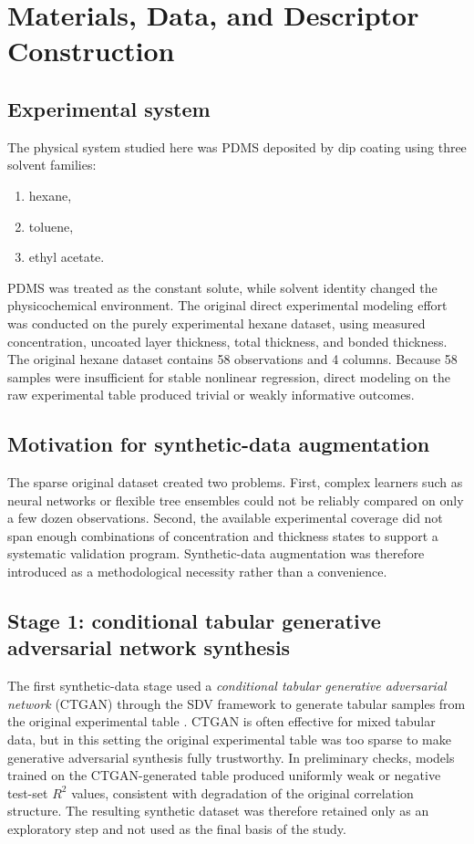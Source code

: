 \documentclass[11pt]{article}
\begin{document}
\section{Materials, Data, and Descriptor Construction}

\subsection{Experimental system}
The physical system studied here was PDMS deposited by dip coating using three solvent families:
\begin{enumerate}
    \item hexane,
    \item toluene,
    \item ethyl acetate.
\end{enumerate}

PDMS was treated as the constant solute, while solvent identity changed the physicochemical environment. The original direct experimental modeling effort was conducted on the purely experimental hexane dataset, using measured concentration, uncoated layer thickness, total thickness, and bonded thickness. The original hexane dataset contains 58 observations and 4 columns. Because 58 samples were insufficient for stable nonlinear regression, direct modeling on the raw experimental table produced trivial or weakly informative outcomes.

\subsection{Motivation for synthetic-data augmentation}
The sparse original dataset created two problems. First, complex learners such as neural networks or flexible tree ensembles could not be reliably compared on only a few dozen observations. Second, the available experimental coverage did not span enough combinations of concentration and thickness states to support a systematic validation program. Synthetic-data augmentation was therefore introduced as a methodological necessity rather than a convenience.

\subsection{Stage 1: conditional tabular generative adversarial network synthesis}
The first synthetic-data stage used a \textit{conditional tabular generative adversarial network} (CTGAN) through the SDV framework to generate tabular samples from the original experimental table \cite{xu2019}. CTGAN is often effective for mixed tabular data, but in this setting the original experimental table was too sparse to make generative adversarial synthesis fully trustworthy. In preliminary checks, models trained on the CTGAN-generated table produced uniformly weak or negative test-set $R^2$ values, consistent with degradation of the original correlation structure. The resulting synthetic dataset was therefore retained only as an exploratory step and not used as the final basis of the study.
\end{document}
